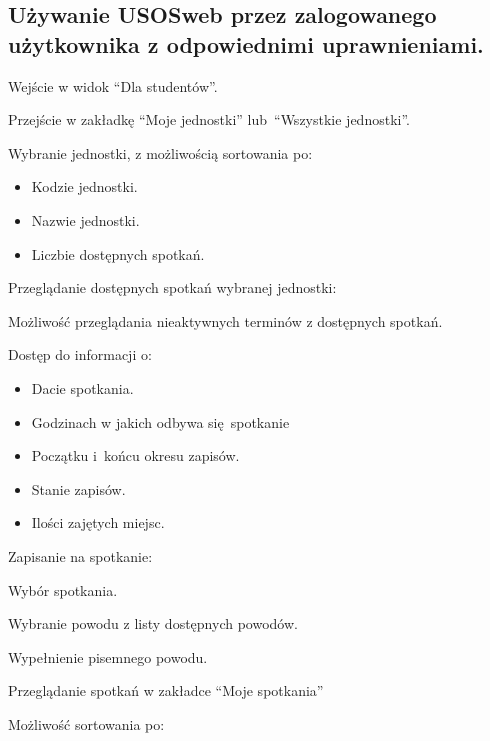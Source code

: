 \documentclass[licencjacka]{pracamgr}
\begin{document}
\subsection{Używanie USOSweb przez zalogowanego użytkownika z odpowiednimi uprawnieniami.}
	\begin{step}
			\item Wejście w widok \enquote{Dla studentów}.
			\item Przejście w zakładkę \enquote{Moje jednostki} lub~\enquote{Wszystkie jednostki}.
			\item Wybranie jednostki, z możliwością sortowania po:
				\begin{itemize}
					\item Kodzie jednostki.
					\item Nazwie jednostki.
					\item Liczbie dostępnych spotkań. 
				\end{itemize}
			\item Przeglądanie dostępnych spotkań wybranej jednostki:
				\begin{step}
					\item Możliwość przeglądania nieaktywnych terminów z dostępnych spotkań.
					\item Dostęp do informacji o:
						\begin{itemize}
							\item Dacie spotkania.
							\item Godzinach w jakich odbywa się~spotkanie
							\item Początku i~końcu okresu zapisów.
							\item Stanie zapisów.
							\item Ilości zajętych miejsc.
						\end{itemize}
				\end{step}
			\item Zapisanie na spotkanie:
				\begin{step}
					\item Wybór spotkania.
					\item Wybranie powodu z listy dostępnych powodów.
					\item Wypełnienie pisemnego powodu.
				\end{step}
			\item Przeglądanie spotkań w zakładce \enquote{Moje spotkania}
				\begin{step}
					\item Możliwość sortowania po:
						\begin{itemize}

\end{itemize}
\end{step}
\end{step}
\end{document}
